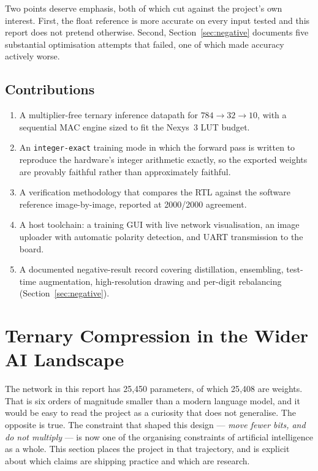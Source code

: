 \documentclass[11pt,a4paper]{article}
\begin{document}
Two points deserve emphasis, both of which cut against the project's own
interest. First, the float reference is more accurate on every input tested and
this report does not pretend otherwise. Second, Section~\ref{sec:negative}
documents five substantial optimisation attempts that failed, one of which made
accuracy actively worse.

\subsection{Contributions}

\begin{enumerate}[leftmargin=*]
\item A multiplier-free ternary inference datapath for
      $784 \rightarrow 32 \rightarrow 10$, with a sequential MAC engine sized to
      fit the Nexys~3 LUT budget.
\item An \texttt{integer-exact} training mode in which the forward pass is
      written to reproduce the hardware's integer arithmetic exactly, so the
      exported weights are provably faithful rather than approximately faithful.
\item A verification methodology that compares the RTL against the software
      reference image-by-image, reported at 2000/2000 agreement.
\item A host toolchain: a training GUI with live network visualisation, an
      image uploader with automatic polarity detection, and UART transmission
      to the board.
\item A documented negative-result record covering distillation, ensembling,
      test-time augmentation, high-resolution drawing and per-digit rebalancing
      (Section~\ref{sec:negative}).
\end{enumerate}

\section{Ternary Compression in the Wider AI Landscape}
\label{sec:futures}

The network in this report has 25{,}450 parameters, of which 25{,}408 are
weights. That is six orders of magnitude
smaller than a modern language model, and it would be easy to read the project
as a curiosity that does not generalise. The opposite is true. The constraint
that shaped this design --- \emph{move fewer bits, and do not multiply} --- is
now one of the organising constraints of artificial intelligence as a whole.
This section places the project in that trajectory, and is explicit about which
claims are shipping practice and which are research.
\end{document}
